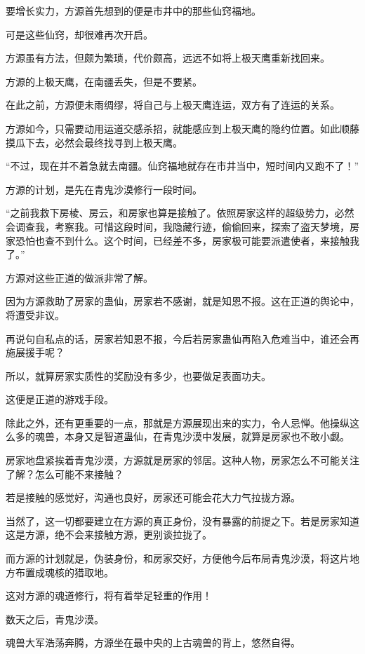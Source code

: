 \begin{this_body}
要增长实力，方源首先想到的便是市井中的那些仙窍福地。

可是这些仙窍，却很难再次开启。

方源虽有方法，但颇为繁琐，代价颇高，远远不如将上极天鹰重新找回来。

方源的上极天鹰，在南疆丢失，但是不要紧。

在此之前，方源便未雨绸缪，将自己与上极天鹰连运，双方有了连运的关系。

方源如今，只需要动用运道交感杀招，就能感应到上极天鹰的隐约位置。如此顺藤摸瓜下去，必然会最终找寻到上极天鹰。

“不过，现在并不着急就去南疆。仙窍福地就存在市井当中，短时间内又跑不了！”

方源的计划，是先在青鬼沙漠修行一段时间。

“之前我救下房棱、房云，和房家也算是接触了。依照房家这样的超级势力，必然会调查我，考察我。可惜这段时间，我隐藏行迹，偷偷回来，探索了盗天梦境，房家恐怕也查不到什么。这个时间，已经差不多，房家极可能要派遣使者，来接触我了。”

方源对这些正道的做派非常了解。

因为方源救助了房家的蛊仙，房家若不感谢，就是知恩不报。这在正道的舆论中，将遭受非议。

再说句自私点的话，房家若知恩不报，今后若房家蛊仙再陷入危难当中，谁还会再施展援手呢？

所以，就算房家实质性的奖励没有多少，也要做足表面功夫。

这便是正道的游戏手段。

除此之外，还有更重要的一点，那就是方源展现出来的实力，令人忌惮。他操纵这么多的魂兽，本身又是智道蛊仙，在青鬼沙漠中发展，就算是房家也不敢小觑。

房家地盘紧挨着青鬼沙漠，方源就是房家的邻居。这种人物，房家怎么不可能关注了解？怎么可能不来接触？

若是接触的感觉好，沟通也良好，房家还可能会花大力气拉拢方源。

当然了，这一切都要建立在方源的真正身份，没有暴露的前提之下。若是房家知道这是方源，绝不会来接触方源，更别谈拉拢了。

而方源的计划就是，伪装身份，和房家交好，方便他今后布局青鬼沙漠，将这片地方布置成魂核的猎取地。

这对方源的魂道修行，将有着举足轻重的作用！

数天之后，青鬼沙漠。

魂兽大军浩荡奔腾，方源坐在最中央的上古魂兽的背上，悠然自得。


\end{this_body}

